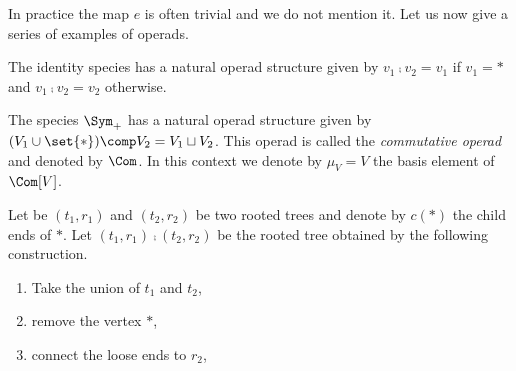 In practice the map $e$ is often trivial and we do not mention it. Let us now give a series of examples of
operads.

\begin{description}\label{ex_operad}
    \item[Identity.] The identity species has a natural operad structure given by $v_1\comp v_2 = v_1$ if
    $v_1=\ast$ and $v_1\comp v_2=v_2$ otherwise.
    \item[Com.] The species $\Sym_+$ has a natural operad structure given by 
    $(V_1\cup\set{\ast})\comp V_2 = V_1\sqcup V_2$. This operad is called the {\em commutative operad} and denoted 
    by $\Com$. 
    In this context we denote by $\mu_V=V$ the basis element of $\Com[V]$.
    \item[NAP.] Let be $(t_1,r_1)$ and $(t_2,r_2)$ be two rooted trees and denote by $c(\ast)$ the child ends of $\ast$. 
    Let $(t_1,r_1)\comp (t_2,r_2)$ be the rooted tree obtained by the following construction.
    \begin{enumerate}
        \item Take the union of $t_1$ and $t_2$,

        \item remove the vertex $\ast$,

        \item connect the loose ends to $r_2$,


\end{enumerate}
\end{description}
